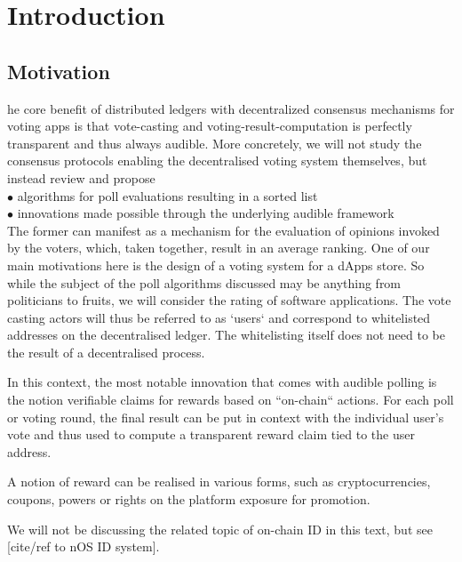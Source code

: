 
\section{Introduction}
\subsection{Motivation}
he core benefit of distributed ledgers with decentralized consensus mechanisms for voting apps is that vote-casting and voting-result-computation is perfectly transparent and thus always audible.
More concretely, we will not study the consensus protocols enabling the decentralised voting system themselves, but instead review and propose\\
$\bullet$ algorithms for poll evaluations resulting in a sorted list\\
$\bullet$ innovations made possible through the underlying audible framework\\

The former can manifest as a mechanism for the evaluation of opinions invoked by the voters, which, taken together, result in an average ranking. 
One of our main motivations here is the design of a voting system for a dApps store. So while the subject of the poll algorithms discussed may be anything from politicians to fruits, we will consider the rating of software applications. 
The vote casting actors will thus be referred to as `users` and correspond to whitelisted addresses on the decentralised ledger. 
The whitelisting itself does not need to be the result of a decentralised process. 

In this context, the most notable innovation that comes with audible polling is the notion verifiable claims for rewards based on ``on-chain`` actions. 
For each poll or voting round, the final result can be put in context with the individual user's vote and thus used to compute a transparent reward claim tied to the user address. 

A notion of reward can be realised in various forms, such as cryptocurrencies, coupons, powers or rights on the platform exposure for promotion.

We will not be discussing the related topic of on-chain ID in this text, but see [cite/ref to nOS ID system].